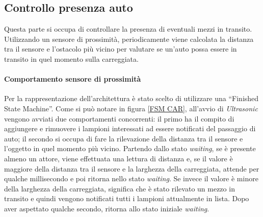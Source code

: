 \newpage
\subsection{Controllo presenza auto}
Questa parte si occupa di controllare la presenza di eventuali mezzi in transito.
Utilizzando un sensore di prossimità, periodicamente viene calcolata la distanza tra il sensore e l'ostacolo più vicino per valutare se un'auto possa essere in transito in quel momento sulla carreggiata.
\paragraph{Comportamento sensore di prossimità}
Per la rappresentazione dell'architettura è stato scelto di utilizzare una ``Finished State Machine''.
Come si può notare in figura \ref{FSM CAR}, all'avvio di \textit{Ultrasonic} vengono avviati due comportamenti concorrenti: il primo ha il compito di aggiungere e rimuovere i lampioni interessati ad essere notificati del passaggio di auto; il secondo si occupa di fare la rilevazione della distanza tra il sensore e l'oggetto in quel momento più vicino.
Partendo dallo stato \textit{waiting}, se è presente almeno un attore, viene effettuata una lettura di distanza e, se il valore è maggiore della distanza tra il sensore e la larghezza della carreggiata, attende per qualche millisecondo e poi ritorna nello stato \textit{waiting}.
Se invece il valore è minore della larghezza della carreggiata, significa che è stato rilevato un mezzo in transito e quindi vengono notificati tutti i lampioni attualmente in lista.
Dopo aver aspettato qualche secondo, ritorna allo stato iniziale \textit{waiting}.
